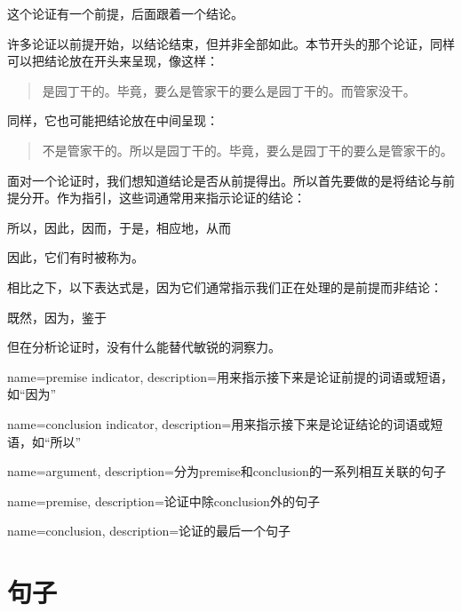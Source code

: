 这个论证有一个前提，后面跟着一个结论。

许多论证以前提开始，以结论结束，但并非全部如此。本节开头的那个论证，同样可以把结论放在开头来呈现，像这样：


\begin{quote}
		是园丁干的。毕竟，要么是管家干的要么是园丁干的。而管家没干。
	\end{quote}


同样，它也可能把结论放在中间呈现：


\begin{quote}
		不是管家干的。所以是园丁干的。毕竟，要么是园丁干的要么是管家干的。
	\end{quote}


面对一个论证时，我们想知道结论是否从前提得出。所以首先要做的是将结论与前提分开。作为指引，这些词通常用来指示论证的结论：


\begin{center}
		所以，因此，因而，于是，相应地，从而
	\end{center}


因此，它们有时被称为。

相比之下，以下表达式是，因为它们通常指示我们正在处理的是前提而非结论：


\begin{center}
		既然，因为，鉴于
	\end{center}


但在分析论证时，没有什么能替代敏锐的洞察力。

{
name=premise indicator,
description={用来指示接下来是论证前提的词语或短语，如“因为”}
}

{
name=conclusion indicator,
description={用来指示接下来是论证结论的词语或短语，如“所以”}
}

{
name=argument,
description={分为\gls{premise}和\gls{conclusion}的一系列相互关联的句子}
}

{
name=premise,
description={论证中除\gls{conclusion}外的句子}
}

{
name=conclusion,
description={论证的最后一个句子}
}

\section{句子}
\label{intro.sentences}


